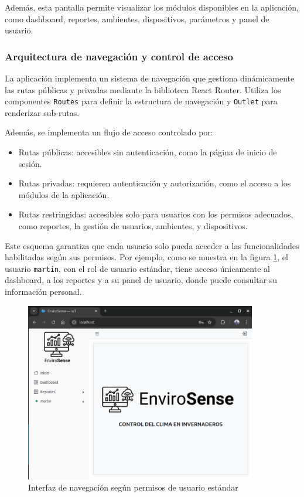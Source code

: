 Además, esta pantalla permite visualizar los módulos disponibles en la
aplicación, como dashboard, reportes, ambientes, dispositivos, parámetros y
panel de usuario.

\subsubsection{Arquitectura de navegación y control de acceso}

La aplicación implementa un sistema de navegación que gestiona dinámicamente
las rutas públicas y privadas mediante la biblioteca React Router. Utiliza los
componentes \texttt{Routes} para definir la estructura de navegación y
\texttt{Outlet} para renderizar sub-rutas.

Además, se implementa un flujo de acceso controlado por:

\begin{itemize}
    \item Rutas públicas: accesibles sin autenticación, como la página de inicio de
          sesión.
    \item Rutas privadas: requieren autenticación y autorización, como el acceso a los
          módulos de la aplicación.
    \item Rutas restringidas: accesibles solo para usuarios con los permisos adecuados,
          como reportes, la gestión de usuarios, ambientes, y dispositivos.
\end{itemize}

Este esquema garantiza que cada usuario solo pueda acceder a las
funcionalidades habilitadas según sus permisos. Por ejemplo, como se muestra en
la figura \ref{fig:navegacion}, el usuario \texttt{martin}, con el rol de
usuario estándar, tiene acceso únicamente al dashboard, a los reportes y a su
panel de usuario, donde puede consultar su información personal.

\begin{figure}[H]
    \centering
    \includegraphics[width=0.90\textwidth]{./Images/26_navegacion.png}
    \caption{Interfaz de navegación según permisos de usuario estándar}
    \label{fig:navegacion}
\end{figure}

